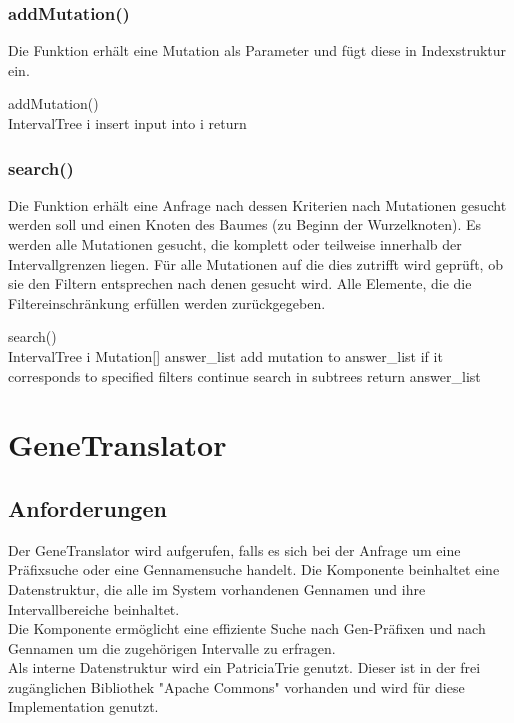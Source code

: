 \documentclass[]{article}
\begin{document}
\subsubsection{addMutation()}
Die Funktion erhält eine Mutation als Parameter und fügt diese in Indexstruktur ein.
\begin{algorithm}
addMutation()\\
IntervalTree i\;
insert input into i\;
return\;
\end{algorithm}
\subsubsection{search()}
Die Funktion erhält eine Anfrage nach dessen Kriterien nach Mutationen gesucht werden soll und einen Knoten des Baumes (zu Beginn der Wurzelknoten). Es werden alle Mutationen gesucht, die komplett oder teilweise innerhalb der Intervallgrenzen liegen. Für alle Mutationen auf die dies zutrifft wird geprüft, ob sie den Filtern entsprechen nach denen gesucht wird. Alle Elemente, die die Filtereinschränkung erfüllen werden zurückgegeben.
\begin{algorithm}
search()\\
IntervalTree i\;
Mutation[] answer\_list\;
{
{add mutation to answer\_list if it corresponds to specified filters\;}
{continue search in subtrees\;}}
return answer\_list\;
\end{algorithm}
\newpage

\section{GeneTranslator}
\subsection{Anforderungen}
Der GeneTranslator wird aufgerufen, falls es sich bei der Anfrage um eine Präfixsuche oder eine Gennamensuche handelt. Die Komponente beinhaltet eine Datenstruktur, die alle im System vorhandenen Gennamen und ihre Intervallbereiche beinhaltet.\\
Die Komponente ermöglicht eine effiziente Suche nach Gen-Präfixen und nach Gennamen um die zugehörigen Intervalle zu erfragen.\\
Als interne Datenstruktur wird ein PatriciaTrie genutzt. Dieser ist in der frei zugänglichen Bibliothek "Apache Commons" vorhanden und wird für diese Implementation genutzt.
\end{document}
